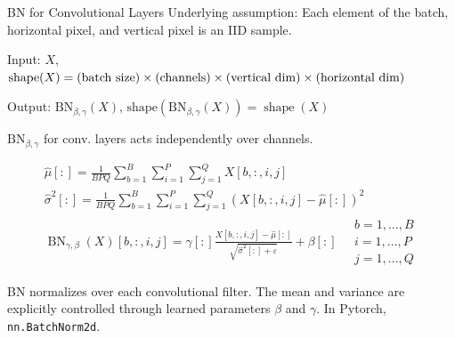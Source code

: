 \begin{frame}[allowframebreaks]

\begin{mydefinitionblock}{6.47}{BN for Convolutional Layers}
    Underlying assumption: Each element of the batch, horizontal pixel, and vertical pixel is an IID sample.

    Input: $X$, $\text{shape}(X) =\\\text{(batch size)} \times \text{(channels)} \times \text{(vertical dim)} \times \text{(horizontal dim)}$

    Output: $\mathrm{BN}_{\beta, \gamma}(X)$, $\text{shape} \left(\mathrm{BN}_{\beta, \gamma}(X)\right)=\operatorname{shape}(X)$

    $\mathrm{BN}_{\beta, \gamma}$ for conv. layers acts independently over channels.

    $$
    \begin{gathered}
    \hat{\mu}[:]=\frac{1}{B P Q} \sum_{b=1}^{B} \sum_{i=1}^{P} \sum_{j=1}^{Q} X[b,:, i, j] \\
    \hat{\sigma}^{2}[:]=\frac{1}{B P Q} \sum_{b=1}^{B} \sum_{i=1}^{P} \sum_{j=1}^{Q}(X[b,:, i, j]-\hat{\mu}[:])^{2} \\
    \operatorname{BN}_{\gamma, \beta}(X)[b,:, i, j]=\gamma[:] \frac{X[b,:, i, j]-\hat{\mu}[:]}{\sqrt{\hat{\sigma}^{2}[:]+\varepsilon}}+\beta[:] \quad \begin{array}{l}
    b=1, \ldots, B \\
    i=1, \ldots, P \\
    j=1, \ldots, Q
    \end{array}
    \end{gathered}
    $$

    BN normalizes over each convolutional filter. The mean and variance are explicitly controlled through learned parameters $\beta$ and $\gamma$. In Pytorch, \verb|nn.BatchNorm2d|.
\end{mydefinitionblock}

\end{frame}

